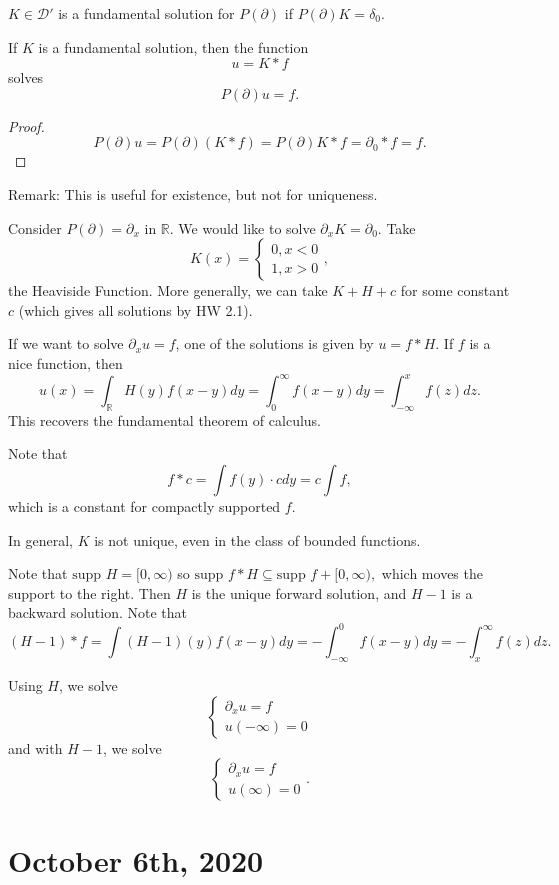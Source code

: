 \documentclass[11pt]{scrartcl}
\newcommand{\R}{\mathbb{R}}
\newcommand{\supp}{\text{supp }}
\begin{document}
\begin{definition} $K \in \mathcal D'$ is a fundamental solution for $P(\partial)$ if $P(\partial) K = \delta_0$.
\end{definition}
\begin{proposition} If $K$ is a fundamental solution, then the function $$u = K*f$$ solves $$P(\partial)u = f.$$
\end{proposition}
\begin{proof}
$$P(\partial)u = P(\partial)(K*f) = P(\partial)K * f = \partial_0 * f = f.$$
\end{proof}
Remark:  This is useful for existence, but not for uniqueness.
\begin{example}
Consider $P(\partial) = \partial_x$ in $\R$.  We would like to solve $\partial_x K = \partial_0$.  Take $$K(x) = \begin{cases} 0, x < 0 \\1, x > 0 \end{cases},$$
the Heaviside Function.  More generally, we can take $K + H+c$ for some constant $c$ (which gives all solutions by HW 2.1).

If we want to solve $\partial_x u = f$, one of the solutions is given by $u = f * H$.  If $f$ is a nice function, then
$$u(x) = \int_\R H(y)f(x-y)dy = \int_{0}^{\infty}f(x-y)dy = \int_{-\infty}^x f(z)dz.$$
This recovers the fundamental theorem of calculus.

Note that 
$$f * c = \int f(y)\cdot c dy = c \int f,$$
which is a constant for compactly supported $f$.
\end{example}
In general, $K$ is not unique, even in the class of bounded functions.  

Note that $\supp H = [0, \infty)$ so $\supp f * H \subseteq \supp f + [0, \infty),$ which moves the support to the right.  Then $H$ is the unique forward solution, and $H-1$ is a backward solution.  Note that
$$(H-1) * f = \int (H-1)(y)f(x-y)dy = - \int_{-\infty}^0 f(x-y)dy = - \int_x^\infty f(z)dz.$$

Using $H$, we solve 
$$\begin{cases} \partial_x u = f \\ u(-\infty) = 0 \end{cases}$$
and with $H-1$, we solve
$$\begin{cases} \partial_x u = f \\ u(\infty) = 0 \end{cases}.$$
\pagebreak
\section{October 6th, 2020}
\end{document}
